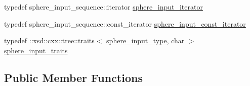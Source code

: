 \begin{DoxyCompactItemize}
\item 
typedef sphere\+\_\+input\+\_\+sequence\+::iterator \hyperlink{classinput__t_ab8ba0d1f12d650cf8f5db6b8262baa0e}{sphere\+\_\+input\+\_\+iterator}
\item 
typedef sphere\+\_\+input\+\_\+sequence\+::const\+\_\+iterator \hyperlink{classinput__t_aa281fd31856422d1cb3934608b8e0185}{sphere\+\_\+input\+\_\+const\+\_\+iterator}
\item 
typedef \+::xsd\+::cxx\+::tree\+::traits$<$ \hyperlink{classinput__t_a75628386280268669a4cc94066bd8547}{sphere\+\_\+input\+\_\+type}, char $>$ \hyperlink{classinput__t_afb3a266016b34553b5f045eaddf78031}{sphere\+\_\+input\+\_\+traits}
\end{DoxyCompactItemize}
\subsection*{Public Member Functions}
